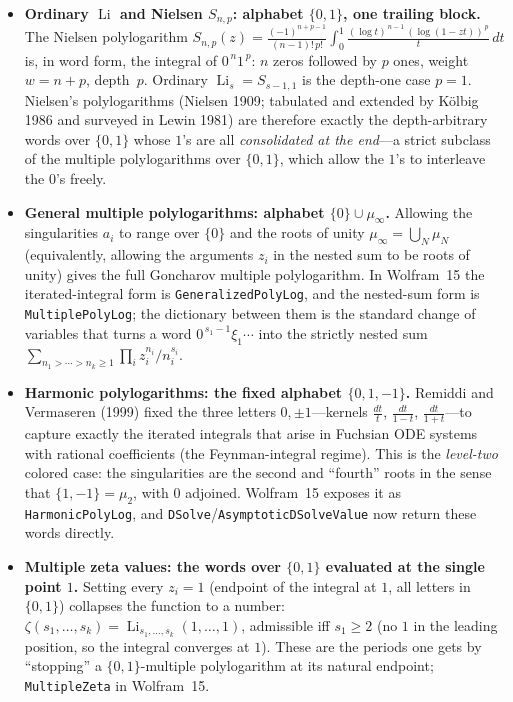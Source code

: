 \documentclass[11pt]{article}
\DeclareMathOperator{\Li}{Li}
\theoremstyle{plain}
\theoremstyle{remark}
\begin{document}
\begin{itemize}
\item \textbf{Ordinary $\Li$ and Nielsen $S_{n,p}$: alphabet $\{0,1\}$, one trailing block.} The Nielsen polylogarithm
$S_{n,p}(z)=\frac{(-1)^{n+p-1}}{(n-1)!\,p!}\int_0^1 \frac{(\log t)^{\,n-1}\,(\log(1-zt))^{\,p}}{t}\,dt$
is, in word form, the integral of $0^{\,n}1^{\,p}$: $n$ zeros followed by $p$ ones, weight $w=n+p$, depth~$p$. Ordinary $\Li_s=S_{s-1,1}$ is the depth-one case $p=1$. Nielsen's polylogarithms (Nielsen 1909; tabulated and extended by K\"olbig 1986 and surveyed in Lewin 1981) are therefore exactly the depth-arbitrary words over $\{0,1\}$ whose $1$'s are all \emph{consolidated at the end}---a strict subclass of the multiple polylogarithms over $\{0,1\}$, which allow the $1$'s to interleave the $0$'s freely.

\item \textbf{General multiple polylogarithms: alphabet $\{0\}\cup\mu_\infty$.} Allowing the singularities $a_i$ to range over $\{0\}$ and the roots of unity $\mu_\infty=\bigcup_N\mu_N$ (equivalently, allowing the arguments $z_i$ in the nested sum to be roots of unity) gives the full Goncharov multiple polylogarithm. In Wolfram~15 the iterated-integral form is \texttt{GeneralizedPolyLog}, and the nested-sum form is \texttt{MultiplePolyLog}; the dictionary between them is the standard change of variables that turns a word $0^{\,s_1-1}\xi_1\cdots$ into the strictly nested sum $\sum_{n_1>\cdots>n_k\ge1}\prod_i z_i^{n_i}/n_i^{s_i}$.

\item \textbf{Harmonic polylogarithms: the fixed alphabet $\{0,1,-1\}$.} Remiddi and Vermaseren (1999) fixed the three letters $0,\pm1$---kernels $\frac{dt}{t}$, $\frac{dt}{1-t}$, $\frac{dt}{1+t}$---to capture exactly the iterated integrals that arise in Fuchsian ODE systems with rational coefficients (the Feynman-integral regime). This is the \emph{level-two} colored case: the singularities are the second and ``fourth'' roots in the sense that $\{1,-1\}=\mu_2$, with $0$ adjoined. Wolfram~15 exposes it as \texttt{HarmonicPolyLog}, and \texttt{DSolve}/\texttt{AsymptoticDSolveValue} now return these words directly.

\item \textbf{Multiple zeta values: the words over $\{0,1\}$ evaluated at the single point $1$.} Setting every $z_i=1$ (endpoint of the integral at $1$, all letters in $\{0,1\}$) collapses the function to a number: $\zeta(s_1,\dots,s_k)=\Li_{s_1,\dots,s_k}(1,\dots,1)$, admissible iff $s_1\ge2$ (no $1$ in the leading position, so the integral converges at $1$). These are the periods one gets by ``stopping'' a $\{0,1\}$-multiple polylogarithm at its natural endpoint; \texttt{MultipleZeta} in Wolfram~15.
\end{itemize}
\end{document}
